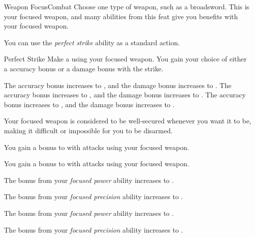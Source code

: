     \begin{feat}{Weapon Focus}{Combat}
         Choose one type of weapon, such as a broadsword.
        This is your focused weapon, and many abilities from this feat give you benefits with your focused weapon.

         You can use the \textit{perfect strike} ability as a standard action.
        \begin{freeability}{Perfect Strike}
            Make a  using your focused weapon.
            You gain your choice of either a  accuracy bonus or a  damage bonus with the strike.

            \rankline
             The accuracy bonus increases to , and the damage bonus increases to .
             The accuracy bonus increases to , and the damage bonus increases to .
             The accuracy bonus increases to , and the damage bonus increases to .
        \end{freeability}

         Your focused weapon is considered to be well-secured whenever you want it to be, making it difficult or impossible for you to be disarmed.

         You gain a  bonus to  with attacks using your focused weapon.

         You gain a  bonus to  with attacks using your focused weapon.

         The bonus from your \textit{focused power} ability increases to .

         The bonus from your \textit{focused precision} ability increases to .

         The bonus from your \textit{focused power} ability increases to .

         The bonus from your \textit{focused precision} ability increases to .
    \end{feat}

